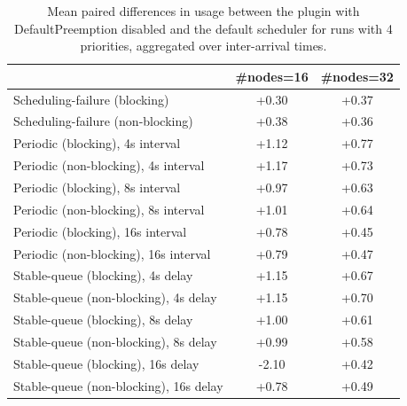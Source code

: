 \begin{table}[t]
\tiny
\setlength{\tabcolsep}{1.2pt}
\renewcommand{\arraystretch}{1.12}
\centering
\caption{Mean paired differences in usage between the plugin with DefaultPreemption disabled and the default scheduler for runs with 4 priorities, aggregated over inter-arrival times.}
\label{tab:usage-defpreempt0-prio4-std0-agg-arrival}
\begin{tabular}{l c c}
\toprule
 & \#nodes=16 & \#nodes=32 \\
\midrule
Scheduling-failure (blocking) & +0.30 & +0.37 \\
Scheduling-failure (non-blocking) & +0.38 & +0.36 \\
Periodic (blocking), 4s interval & +1.12 & +0.77 \\
Periodic (non-blocking), 4s interval & +1.17 & +0.73 \\
Periodic (blocking), 8s interval & +0.97 & +0.63 \\
Periodic (non-blocking), 8s interval & +1.01 & +0.64 \\
Periodic (blocking), 16s interval & +0.78 & +0.45 \\
Periodic (non-blocking), 16s interval & +0.79 & +0.47 \\
Stable-queue (blocking), 4s delay & +1.15 & +0.67 \\
Stable-queue (non-blocking), 4s delay & +1.15 & +0.70 \\
Stable-queue (blocking), 8s delay & +1.00 & +0.61 \\
Stable-queue (non-blocking), 8s delay & +0.99 & +0.58 \\
Stable-queue (blocking), 16s delay & -2.10 & +0.42 \\
Stable-queue (non-blocking), 16s delay & +0.78 & +0.49 \\
\bottomrule
\end{tabular}
\end{table}
